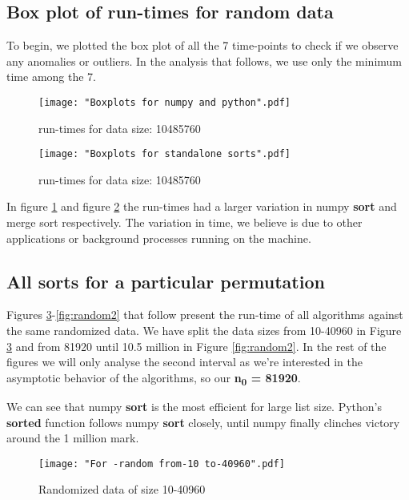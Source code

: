 \documentclass[sigconf, nonacm, natbib, screen, balance=False]{acmart}
\begin{document}
\subsection{Box plot of run-times for random data }\label{scatter}
To begin, we plotted the box plot of all the 7 time-points to check if we observe any anomalies or outliers. In the analysis that follows, we use only the minimum time among the 7.

\begin{figure}[ht]
\texttt{[image: "Boxplots for numpy and python".pdf]}
    \caption{run-times for data size: 10485760 }
    \label{fig:box1}
\end{figure}

\begin{figure}[ht]
\texttt{[image: "Boxplots for standalone sorts".pdf]}
    \caption{run-times for data size: 10485760  }
    \label{fig:box2}
\end{figure}

In figure \ref{fig:box1} and figure \ref{fig:box2} the run-times had a larger variation in numpy \textbf{sort} and merge sort respectively. The variation in time, we believe is due to other applications or background processes running on the machine.

\subsection{All sorts for a particular permutation }\label{allsorts}

Figures \ref{fig:random1}-\ref{fig:random2} that follow present the run-time of all algorithms against the same randomized data. We have split the data sizes from 10-40960 in Figure \ref{fig:random1} and from 81920 until 10.5 million in Figure \ref{fig:random2}. In the rest of the figures we will only analyse the second interval as we're interested in the asymptotic behavior of the algorithms, so our \textbf{n\textsubscript{0} = 81920}.

We can see that numpy \textbf{sort} is the most efficient for large list size. Python's \textbf{sorted} function follows numpy \textbf{sort} closely, until numpy finally clinches victory around the 1 million mark.

\begin{figure}[ht]
\texttt{[image: "For -random from-10 to-40960".pdf]}
    \caption{Randomized data of size 10-40960 }
    \label{fig:random1}
\end{figure}
\end{document}
